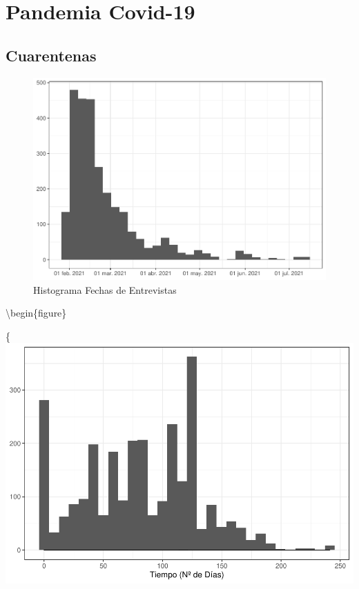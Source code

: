 \documentclass[
  12pt,
]{book}
\begin{document}
\hypertarget{pandemia-covid-19}{%
\chapter{Pandemia Covid-19}\label{pandemia-covid-19}}

\hypertarget{cuarentenas}{%
\section{Cuarentenas}\label{cuarentenas}}

\begin{figure}

{\centering \includegraphics{reporte-elsoc_files/figure-latex/hist-fecha-2021-1} 

}

\caption{Histograma Fechas de Entrevistas}\label{fig:hist-fecha-2021}
\end{figure}

\textbackslash begin\{figure\}

\{\centering \includegraphics{reporte-elsoc_files/figure-latex/dias_cuarentena-heter-1}
\end{document}
